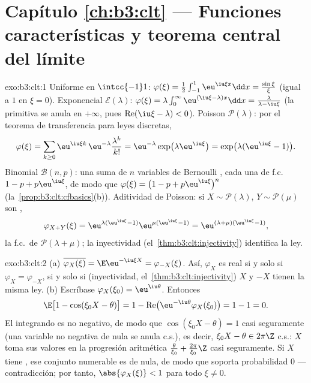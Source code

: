\section*{Capítulo \ref{ch:b3:clt} --- Funciones
características y teorema central del límite}

\begin{solution}{exo:b3:clt:1}
Uniforme en $\intcc{-1}1$: $\varphi(\xi) =
\frac12\int_{-1}^1\eu^{\iu\xi x}\dd x =
\frac{\sin\xi}{\xi}$ (igual a $1$ en $\xi = 0$). Exponencial
$\mathcal E(\lambda)$: $\varphi(\xi) =
\lambda\int_0^\infty\eu^{(\iu\xi - \lambda)x}\dd x =
\frac{\lambda}{\lambda - \iu\xi}$ (la primitiva se anula en $+\infty$,
pues $\operatorname{Re}(\iu\xi -
\lambda) < 0$). Poisson $\mathcal P(\lambda)$: por el teorema de
transferencia para leyes discretas,
\[
\varphi(\xi) = \sum_{k\geq0}\eu^{\iu\xi
k}\,\eu^{-\lambda}\frac{\lambda^k}{k!}
= \eu^{-\lambda}\exp\bigl(\lambda\eu^{\iu\xi}\bigr)
= \exp\bigl(\lambda(\eu^{\iu\xi} - 1)\bigr).
\]
Binomial $\mathcal B(n, p)$: una suma de $n$ variables de Bernoulli
, cada una de
f.c.\ $1 - p + p\eu^{\iu\xi}$, de modo que
$\varphi(\xi) = \bigl(1 - p + p\eu^{\iu\xi}\bigr)^n$
(la~\cref{prop:b3:clt:cfbasics}(b)). Aditividad de Poisson: si $X
\sim \mathcal P(\lambda)$, $Y \sim \mathcal P(\mu)$ son
,
\[
\varphi_{X+Y}(\xi) = \eu^{\lambda(\eu^{\iu\xi}-1)}
\eu^{\mu(\eu^{\iu\xi}-1)} =
\eu^{(\lambda+\mu)(\eu^{\iu\xi}-1)},
\]
la f.c.\ de $\mathcal P(\lambda + \mu)$; la inyectividad
(el~\cref{thm:b3:clt:injectivity}) identifica la ley.
\end{solution}

\begin{solution}{exo:b3:clt:2}
(a) $\overline{\varphi_X(\xi)} = \E\eu^{-\iu\xi X} =
\varphi_{-X}(\xi)$. Así, $\varphi_X$ es real si y solo si
$\varphi_X = \varphi_{-X}$, si y solo si (inyectividad,
el~\cref{thm:b3:clt:injectivity}) $X$ y $-X$ tienen la misma ley. (b)
Escríbase $\varphi_X(\xi_0) = \eu^{\iu\theta}$. Entonces
\[
\E\bigl[1 - \cos(\xi_0X - \theta)\bigr]
= 1 - \operatorname{Re}\bigl(\eu^{-\iu\theta}
\varphi_X(\xi_0)\bigr) = 1 - 1 = 0 .
\]
El integrando es no negativo, de modo que $\cos(\xi_0X - \theta) = 1$
casi seguramente (una variable no negativa de
 nula se anula c.s.), es
decir, $\xi_0X - \theta \in 2\pi\Z$ c.s.: $X$ toma sus valores en la
progresión aritmética $\frac{\theta}{\xi_0} + \frac{2\pi}{\xi_0}\Z$ casi
seguramente. Si $X$ tiene , ese
conjunto numerable es de  nula, de modo que soporta
probabilidad $0$ --- contradicción; por tanto,
$\abs{\varphi_X(\xi)} < 1$ para todo $\xi \neq 0$.
\end{solution}

